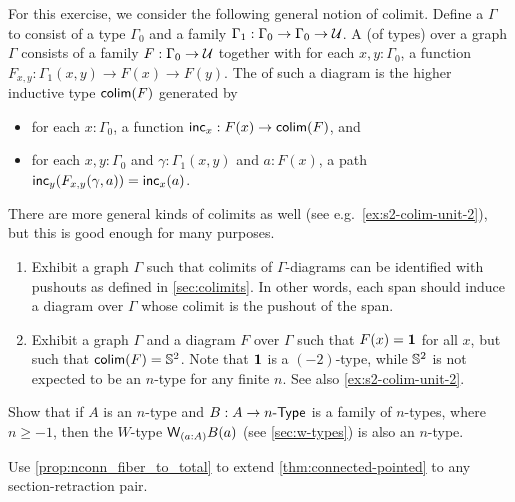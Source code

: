 \documentclass[hott-all.tex]{subfiles}
\begin{document}
\begin{ex}
  For this exercise, we consider the following general notion of colimit.
  Define a  $\Gamma$ to consist of a type $\Gamma_0$ and a family $\Gamma_1 : \Gamma_0 \to \Gamma_0 \to \mathcal{U}$.
  A  (of types) over a graph $\Gamma$ consists of a family $F:\Gamma_0 \to \mathcal{U}$ together with for each $x,y:\Gamma_0$, a function $F_{x,y}:\Gamma_1(x,y) \to F(x) \to F(y)$.
  The  of such a diagram is the higher inductive type $\mathsf{colim}(F)$ generated by
  \begin{itemize}
  \item for each $x:\Gamma_0$, a function $\mathsf{inc}_x:F(x) \to \mathsf{colim}(F)$, and
  \item for each $x,y:\Gamma_0$ and $\gamma:\Gamma_1(x,y)$ and $a:F(x)$, a path $\mathsf{inc}_y(F_{x,y}(\gamma,a)) = \mathsf{inc}_x(a)$.
  \end{itemize}
  There are more general kinds of colimits as well (see e.g.\ \cref{ex:s2-colim-unit-2}), but this is good enough for many purposes.
  \begin{enumerate}
  \item Exhibit a graph $\Gamma$ such that colimits of $\Gamma$-diagrams can be identified with pushouts as defined in \cref{sec:colimits}.
    In other words, each span should induce a diagram over $\Gamma$ whose colimit is the pushout of the span.
  \item Exhibit a graph $\Gamma$ and a diagram $F$ over $\Gamma$ such that $F(x)=\mathbf{1}$ for all $x$, but such that $\mathsf{colim}(F)=\mathbb{S}^2$.
    Note that $\mathbf{1}$ is a $(-2)$-type, while $\mathbb{S}^2$ is not expected to be an $n$-type for any finite $n$.
    See also \cref{ex:s2-colim-unit-2}.
  \end{enumerate}
\end{ex}

\begin{ex}
  Show that if $A$ is an $n$-type and $B:A\to {n}\text-\mathsf{Type}$ is a family of $n$-types, where $n\ge -1$, then the $W$-type $\wtype{a:A} B(a)$ (see \cref{sec:w-types}) is also an $n$-type.
\end{ex}

\begin{ex}
  Use \cref{prop:nconn_fiber_to_total} to extend \cref{thm:connected-pointed} to any section-retraction pair.
\end{ex}
\end{document}
